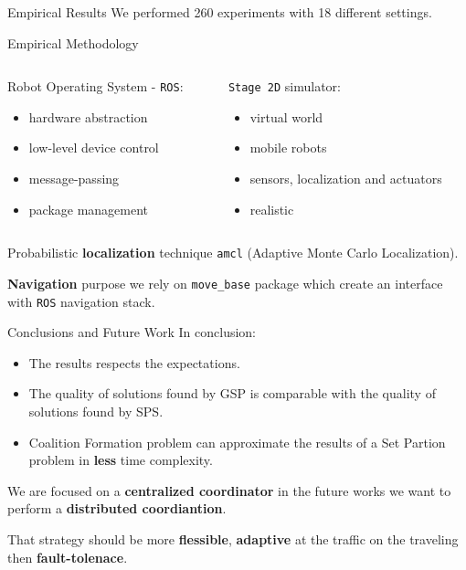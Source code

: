 \begin{frame}[fragile]{Empirical Results}
        We performed 260 experiments with 18 different settings.
    \end{frame}

    \begin{frame}[fragile]{Empirical Methodology}
       
        \begin{columns}
            \begin{column}{.5\textwidth}
                Robot Operating System - \texttt{ROS}:
                \begin{itemize}
                    \item hardware abstraction 
                    \item low-level device control
                    \item message-passing
                    \item package management
                \end{itemize}
            \end{column}
            \begin{column}{.55\textwidth}
                \texttt{Stage 2D} simulator:
                \begin{itemize}
                    \item virtual world
                    \item mobile robots 
                    \item sensors, localization and actuators
                    \item realistic
                \end{itemize}
            \end{column}
        \end{columns}
        \addvspace{0.6cm}
        Probabilistic {\bf localization} technique \texttt{amcl} (Adaptive Monte Carlo Localization).
       
        {\bf Navigation} purpose we rely on \texttt{move\_base} package which create an interface with \texttt{ROS} navigation stack.
    \end{frame}

   

    \begin{frame}[fragile]{Conclusions and Future Work}
        In conclusion: 
        \begin{itemize}
            \item The results respects the expectations.
            \item The quality of solutions found by GSP is comparable with the 
            quality of solutions found by SPS.
            \item Coalition Formation problem can approximate the results 
            of a Set Partion problem in {\bf less} time complexity.
        \end{itemize}
        We are focused on a {\bf centralized coordinator} in the future works we want to 
        perform a {\bf distributed coordiantion}.

        That strategy should be more {\bf flessible}, {\bf adaptive} at the traffic on the traveling then {\bf fault-tolenace}. 
    \end{frame}

